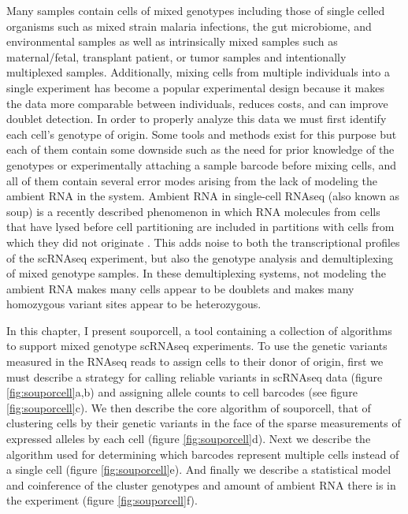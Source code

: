 \par{
Many samples contain cells of mixed genotypes including those of single celled organisms such as mixed strain malaria infections, 
the gut microbiome, and environmental samples as well 
as intrinsically mixed samples such as maternal/fetal, transplant patient, or tumor samples and intentionally multiplexed samples.
Additionally, mixing cells from multiple individuals into a single experiment has become a popular experimental design because it makes the data more comparable between individuals, reduces costs, and can improve doublet detection. 
 In order to properly 
analyze this data we must first identify each cell's genotype of origin. Some tools and methods exist for this purpose \cite{demuxlet} \cite{cellhashing} \cite{scsplit} 
but each of them contain some downside such as the need for prior knowledge of the genotypes or experimentally attaching a sample barcode before mixing cells, and all of them 
contain several error modes arising from the lack of modeling the ambient RNA in the system. Ambient RNA in single-cell RNAseq (also known as soup) is a recently described 
phenomenon in which RNA molecules from cells that have lysed before cell partitioning are included in partitions with cells from which they did not originate \cite{soupx}. This adds noise to both the transcriptional profiles of the scRNAseq experiment, but also the genotype analysis and demultiplexing of mixed genotype samples. 
In these demultiplexing systems, not modeling the ambient RNA makes many cells appear to be doublets and makes many homozygous variant sites appear to be 
heterozygous. 
} \\

\par{
In this chapter, I present souporcell, a tool containing a collection of algorithms to support mixed genotype scRNAseq experiments\cite{souporcell}. 
To use the genetic variants measured in the RNAseq reads to assign cells to their donor of origin, first we must describe a strategy for calling reliable variants in scRNAseq data (figure \ref{fig:souporcell}a,b) and assigning allele counts to cell barcodes (see figure \ref{fig:souporcell}c). We then describe the core algorithm of souporcell, that of clustering cells by their genetic variants in the face of the sparse measurements of expressed alleles by each cell (figure \ref{fig:souporcell}d). Next we describe the algorithm used for determining which barcodes represent multiple cells instead of a single cell (figure \ref{fig:souporcell}e). And finally we describe a statistical model and coinference of the cluster genotypes and amount of ambient RNA there is in the experiment (figure \ref{fig:souporcell}f). 
}


